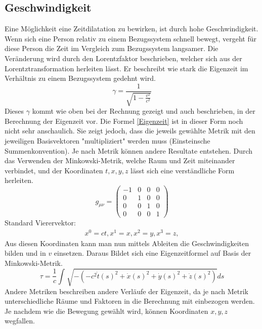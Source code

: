 \begin{refsection}
\subsection{Geschwindigkeit}
Eine M\"oglichkeit eine Zeitdilatation zu bewirken, ist durch hohe Geschwindigkeit. Wenn sich eine Person relativ zu einem Bezugssystem schnell bewegt, vergeht f\"ur diese Person die Zeit im Vergleich zum Bezugssystem langsamer. Die Ver\"anderung wird durch den Lorentzfaktor beschrieben, welcher sich aus der Lorentztransformation herleiten l\"asst. Er beschreibt wie stark die Eigenzeit im  Verhältnis zu einem Bezugssystem gedehnt wird. %
\begin{equation}
    \gamma=\frac{1}{\sqrt{1-\displaystyle\frac{v^2}{c^2}}} 
\end{equation}
Dieses $\gamma$ kommt wie oben bei der Rechnung gezeigt und auch beschrieben, in der Berechnung der Eigenzeit vor. %
Die Formel \ref{Eigenzeit} ist in dieser Form noch nicht sehr anschaulich. Sie zeigt jedoch, dass die jeweils gewählte Metrik mit den jeweiligen Basisvektoren "multipliziert" werden muss (Einsteinsche Summenkonvention). Je nach Metrik können andere Resultate entstehen.
Durch das Verwenden der Minkowski-Metrik, welche Raum und Zeit miteinander verbindet, und der Koordinaten $t, x, y, z$ l\"asst sich eine verst\"andliche Form herleiten. 
\begin{equation}
    g_{\mu\nu}=
    \begin{pmatrix}
        -1 & 0 & 0 & 0 \\
        0 & 1 & 0 & 0 \\
        0 & 0 & 1 & 0 \\
        0 & 0 & 0 & 1
    \end{pmatrix}
\end{equation}
Standard Vierervektor:
\begin{align*}
    x^{0}=ct,
    x^{1}=x,
    x^{2}=y,
    x^{3}=z,
\end{align*}
Aus diesen Koordinaten kann man nun mittels Ableiten die Geschwindigkeiten bilden und in $v$ einsetzen.
Daraus Bildet sich eine Eigenzeitformel auf Basis der Minkowski-Metrik.
\begin{equation}
    \tau
    =
    \frac{1}{c}\int_{}^{}\sqrt{-(-c^2\dot{t}(s)^{2}+\dot{x}(s)^{2}+\dot{y}(s)^{2}+\dot{z}(s)^{2})}ds
\end{equation}
Andere Metriken beschreiben andere Verläufe der Eigenzeit, da je nach Metrik unterschiedliche Räume und Faktoren in die Berechnung mit einbezogen werden. 
Je nachdem wie die Bewegung gew\"ahlt wird, können Koordinaten $x, y, z$ wegfallen.

\end{refsection}
